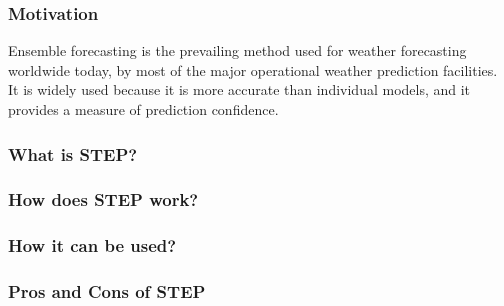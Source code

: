 \documentclass[../paper.tex]{subfiles}
\begin{document}
    \subsubsection{Motivation}
        Ensemble forecasting is the prevailing method used for weather forecasting worldwide today, by most of the major operational weather prediction facilities.
        It is widely used because it is more accurate than individual models, and it provides a measure of prediction confidence.

    \subsubsection{What is STEP?}
    \subsubsection{How does STEP work?}
    \subsubsection{How it can be used?}
    \subsubsection{Pros and Cons of STEP}
\end{document}
